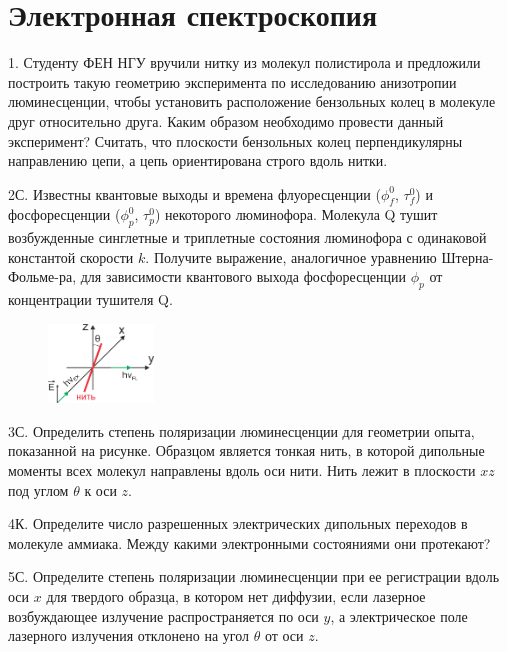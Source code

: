 \setmainfont{Noto Serif}
\setsansfont{Noto Sans}
\setmonofont{Noto Sans Mono}

\section{Электронная спектроскопия}
1. Студенту ФЕН НГУ вручили нитку из молекул полистирола и предложили построить такую геометрию эксперимента по исследованию анизотропии люминесценции, чтобы установить расположение бензольных колец в молекуле друг относительно друга. Каким образом необходимо провести данный эксперимент? Считать, что плоскости бензольных колец перпендикулярны направлению цепи, а цепь ориентирована строго вдоль нитки.\par
2С. Известны квантовые выходы и времена флуоресценции ($\phi_f^0$, $\tau_f^0$) и фосфоресценции ($\phi_p^0$, $\tau_p^0$) некоторого люминофора. Молекула Q тушит возбужденные синглетные и триплетные состояния люминофора с одинаковой константой скорости $k$. Получите выражение, аналогичное уравнению Штерна-Фольме-ра, для зависимости квантового выхода фосфоресценции $\phi_p$ от концентрации тушителя Q.
\par
\begin{figure} %
    \centering
    \vspace{-4.2ex}
    \includegraphics[width=28mm]{images/Fig_2_3_3.png}
    \vspace{-5ex}
\end{figure}
3С. Определить степень поляризации люминесценции для геометрии опыта, показанной на рисунке. Образцом является тонкая нить, в которой дипольные моменты всех молекул направлены вдоль оси нити. Нить лежит в плоскости $xz$ под углом $\theta$ к оси $z$.
\par
4К. Определите число разрешенных электрических дипольных переходов в молекуле аммиака. Между какими электронными состояниями они протекают?
\par
5С. Определите степень поляризации люминесценции при ее регистрации вдоль оси $x$ для твердого образца, в котором нет диффузии, если лазерное возбуждающее излучение распространяется по оси $y$, а электрическое поле лазерного излучения отклонено на угол $\theta$ от оси $z$.
\par
